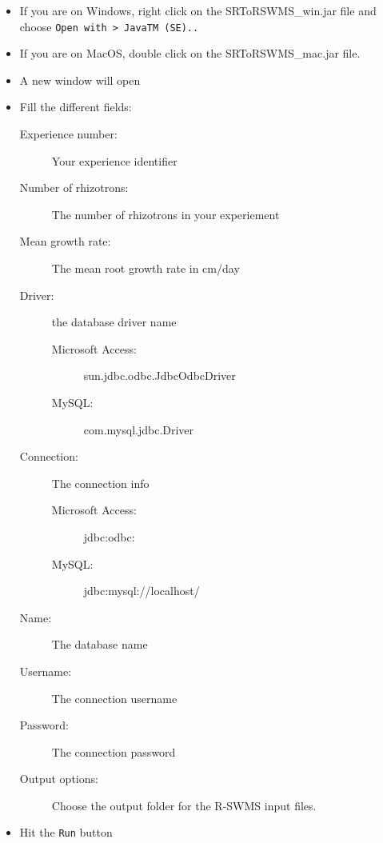 \documentclass[a4paper,english,10pt]{report}
\begin{document}
\begin{itemize}
\item If you are on Windows, right click on the SRToRSWMS\_win.jar file and choose \verb|Open with > JavaTM (SE)..|
\item If you are on MacOS, double click on the SRToRSWMS\_mac.jar file.
\item A new window will open 
\item Fill the different fields:
	\begin{description}
	\item [Experience number:] Your experience identifier
	\item [Number of rhizotrons:] The number of rhizotrons in your experiement
	\item [Mean growth rate:] The mean root growth rate in cm/day
	\item[Driver:] the database driver name 
		\begin{description}
		\item[Microsoft Access:] sun.jdbc.odbc.JdbcOdbcDriver
		\item[MySQL:] com.mysql.jdbc.Driver
		\end{description}
	\item[Connection:] The connection info
		\begin{description}
		\item[Microsoft Access:] jdbc:odbc:
		\item[MySQL:] jdbc:mysql://localhost/
		\end{description}	
	\item[Name:] The database name
	\item[Username:] The connection username
	\item[Password:] The connection password
	\item[Output options:] Choose the output folder for the R-SWMS input files. 
	\end{description}
\item Hit the \verb|Run| button	
\end{itemize}
 

\newpage

\end{document}
